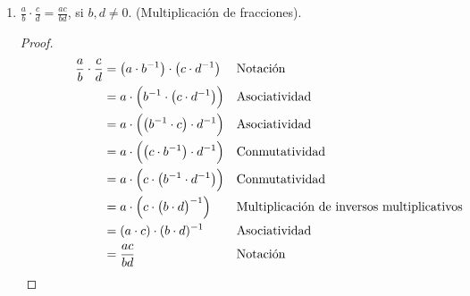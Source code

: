 \documentclass[11pt]{article}
\begin{document}
\begin{enumerate}[label=\alph*)]
 \item $\frac{a}{b} \cdot \frac{c}{d} = \frac{ac}{bd}$, si $b, d \neq 0$. (Multiplicación de fracciones).
 \begin{proof}
 \begin{align*}\qquad \ \qquad
 \frac{a}{b} \cdot \frac{c}{d} &= \left( a \cdot b^{-1} \right) \cdot \left( c \cdot d^{-1} \right) && \text{Notación}\\
 &= a \cdot \Bigl( b^{-1} \cdot \left( c \cdot d^{-1} \right) \Bigr) && \text{Asociatividad}\\
 &= a\cdot \Bigl(\bigl(b^{-1}\cdot c\bigr) \cdot d^{-1}\Bigr) && \text{Asociatividad}\\
 &= a\cdot \Bigl(\bigl(c\cdot b^{-1}\bigr) \cdot d^{-1}\Bigr) && \text{Conmutatividad}\\
 &= a\cdot \Bigl(c\cdot \bigl(b^{-1}\cdot d^{-1}\bigr)\Bigr) && \text{Conmutatividad}\\
 &= a\cdot \Bigl(c\cdot \bigl(b\cdot d\bigr)^{-1}\Bigr) && \text{Multiplicación de inversos multiplicativos}\\
 &= (a\cdot c) \cdot (b\cdot d)^{-1} && \text{Asociatividad}\\
 &= \frac{ac}{bd} && \text{Notación} \qedhere
 \end{align*} 
 \end{proof}
 

\end{enumerate}
\end{document}

